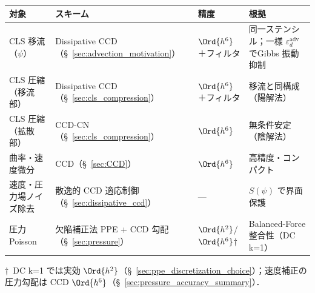 \begin{tcolorbox}[mybox, title={本稿の空間離散化スキームの役割分担}]
\label{box:scheme_roles}
\begin{center}
\renewcommand{\arraystretch}{1.3}
\begin{tabular}{>{\raggedright\arraybackslash}p{2.5cm}>{\raggedright\arraybackslash}p{3.8cm}>{\raggedright\arraybackslash}p{1.5cm}>{\raggedright\arraybackslash}p{4cm}}
\hline
対象 & スキーム & 精度 & 根拠 \\
\hline
CLS 移流（$\psi$） & Dissipative CCD（§~\ref{sec:advection_motivation}） & $\Ord{h^6}$＋フィルタ & 同一ステンシル；一様 $\varepsilon_d^{\mathrm{adv}}$ でGibbs 振動抑制 \\
CLS 圧縮（移流部） & Dissipative CCD（§~\ref{sec:cls_compression}） & $\Ord{h^6}$＋フィルタ & 移流と同構成（陽解法） \\
CLS 圧縮（拡散部） & CCD-CN（§~\ref{sec:cls_compression}） & $\Ord{h^6}$ & 無条件安定（陰解法） \\
曲率・速度微分 & CCD（§~\ref{sec:CCD}） & $\Ord{h^6}$ & 高精度・コンパクト \\
速度・圧力場ノイズ除去 & 散逸的 CCD 適応制御（§~\ref{sec:dissipative_ccd}） & — & $S(\psi)$ で界面保護 \\
圧力 Poisson & 欠陥補正法 PPE + CCD 勾配（§~\ref{sec:pressure}） & $\Ord{h^2}$/$\Ord{h^6}$† & Balanced-Force 整合性（DC k=1） \\
\hline
\end{tabular}
\end{center}
{\small †\ DC k=1 では実効 $\Ord{h^2}$（§~\ref{sec:ppe_discretization_choice}）；速度補正の圧力勾配は CCD $\Ord{h^6}$（§~\ref{sec:pressure_accuracy_summary}）．}
\end{tcolorbox}
